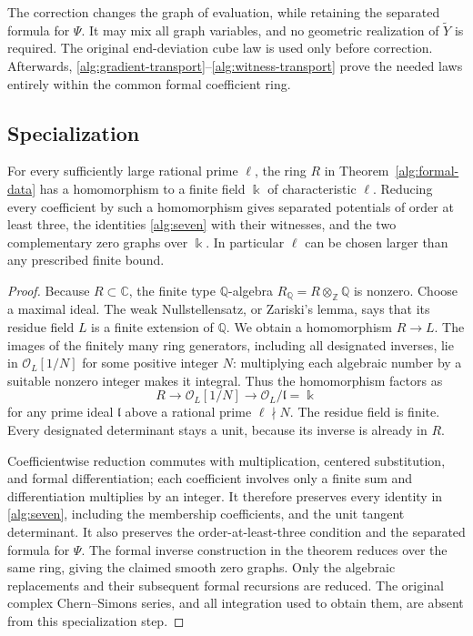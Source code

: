 \begin{remark}
\label{alg:formal-not-geometric}
The correction changes the graph of evaluation, while retaining the
separated formula for $\Psi$. It may mix all graph variables, and no
geometric realization of $\widetilde Y$ is required. The original
end-deviation cube law is used only before correction. Afterwards,
\eqref{alg:gradient-transport}--\eqref{alg:witness-transport} prove the
needed laws entirely within the common formal coefficient ring.
\end{remark}

\subsection{Specialization}

\begin{corollary}
\label{alg:specialization}
For every sufficiently large rational prime $\ell$, the ring $R$ in
Theorem~\ref{alg:formal-data} has a homomorphism to a finite field
$\Bbbk$ of characteristic $\ell$. Reducing every coefficient by
such a homomorphism gives separated potentials of order at least three,
the identities \eqref{alg:seven} with their witnesses, and the two
complementary zero graphs over $\Bbbk$. In particular $\ell$ can
be chosen larger than any prescribed finite bound.
\end{corollary}

\begin{proof}
Because $R\subset\mathbb C$, the finite type
$\mathbb Q$-algebra $R_{\mathbb Q}=R\otimes_{\mathbb Z}\mathbb Q$
is nonzero. Choose a maximal ideal. The weak Nullstellensatz, or
Zariski's lemma, says that its residue field $L$ is a finite extension
of $\mathbb Q$. We obtain a homomorphism $R\to L$.
The images of the finitely many ring generators, including all
designated inverses, lie in $\mathcal O_L[1/N]$ for some positive
integer $N$: multiplying each algebraic number by a suitable nonzero
integer makes it integral. Thus the homomorphism factors as
\[
 R\longrightarrow\mathcal O_L[1/N]\longrightarrow
       \mathcal O_L/\mathfrak l=\Bbbk
\]
for any prime ideal $\mathfrak l$ above a rational prime $\ell\nmid N$.
The residue field is finite. Every designated determinant stays a
unit, because its inverse is already in $R$.

Coefficientwise reduction commutes with multiplication, centered
substitution, and formal differentiation; each coefficient involves
only a finite sum and differentiation multiplies by an integer.
It therefore preserves every identity in \eqref{alg:seven}, including
the membership coefficients, and the unit tangent determinant.
It also preserves the order-at-least-three condition and the separated
formula for $\Psi$. The formal inverse construction in the theorem
reduces over the same ring, giving the claimed smooth zero graphs.
Only the algebraic replacements and their subsequent formal
recursions are reduced. The original complex Chern--Simons series,
and all integration used to obtain them, are absent from this
specialization step.
\end{proof}
